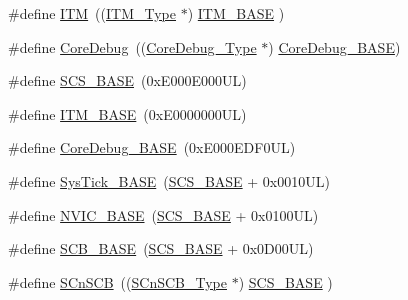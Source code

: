 \begin{DoxyCompactItemize}
\item 
\#define \hyperlink{group___c_m_s_i_s__core__register_gabae7cdf882def602cb787bb039ff6a43}{I\-T\-M}~((\hyperlink{struct_i_t_m___type}{I\-T\-M\-\_\-\-Type}       $\ast$)     \hyperlink{group___c_m_s_i_s__core__register_gadd76251e412a195ec0a8f47227a8359e}{I\-T\-M\-\_\-\-B\-A\-S\-E}      )
\item 
\#define \hyperlink{group___c_m_s_i_s__core__register_gab6e30a2b802d9021619dbb0be7f5d63d}{Core\-Debug}~((\hyperlink{struct_core_debug___type}{Core\-Debug\-\_\-\-Type} $\ast$)     \hyperlink{group___c_m_s_i_s__core__register_ga680604dbcda9e9b31a1639fcffe5230b}{Core\-Debug\-\_\-\-B\-A\-S\-E})
\end{DoxyCompactItemize}
\begin{DoxyCompactItemize}
\item 
\#define \hyperlink{group___c_m_s_i_s__core__register_ga3c14ed93192c8d9143322bbf77ebf770}{S\-C\-S\-\_\-\-B\-A\-S\-E}~(0x\-E000\-E000\-U\-L)
\item 
\#define \hyperlink{group___c_m_s_i_s__core__register_gadd76251e412a195ec0a8f47227a8359e}{I\-T\-M\-\_\-\-B\-A\-S\-E}~(0x\-E0000000\-U\-L)
\item 
\#define \hyperlink{group___c_m_s_i_s__core__register_ga680604dbcda9e9b31a1639fcffe5230b}{Core\-Debug\-\_\-\-B\-A\-S\-E}~(0x\-E000\-E\-D\-F0\-U\-L)
\item 
\#define \hyperlink{group___c_m_s_i_s__core__register_ga58effaac0b93006b756d33209e814646}{Sys\-Tick\-\_\-\-B\-A\-S\-E}~(\hyperlink{group___c_m_s_i_s__core__register_ga3c14ed93192c8d9143322bbf77ebf770}{S\-C\-S\-\_\-\-B\-A\-S\-E} +  0x0010\-U\-L)
\item 
\#define \hyperlink{group___c_m_s_i_s__core__register_gaa0288691785a5f868238e0468b39523d}{N\-V\-I\-C\-\_\-\-B\-A\-S\-E}~(\hyperlink{group___c_m_s_i_s__core__register_ga3c14ed93192c8d9143322bbf77ebf770}{S\-C\-S\-\_\-\-B\-A\-S\-E} +  0x0100\-U\-L)
\item 
\#define \hyperlink{group___c_m_s_i_s__core__register_gad55a7ddb8d4b2398b0c1cfec76c0d9fd}{S\-C\-B\-\_\-\-B\-A\-S\-E}~(\hyperlink{group___c_m_s_i_s__core__register_ga3c14ed93192c8d9143322bbf77ebf770}{S\-C\-S\-\_\-\-B\-A\-S\-E} +  0x0\-D00\-U\-L)
\item 
\#define \hyperlink{group___c_m_s_i_s__core__register_ga9fe0cd2eef83a8adad94490d9ecca63f}{S\-Cn\-S\-C\-B}~((\hyperlink{struct_s_cn_s_c_b___type}{S\-Cn\-S\-C\-B\-\_\-\-Type}    $\ast$)     \hyperlink{group___c_m_s_i_s__core__register_ga3c14ed93192c8d9143322bbf77ebf770}{S\-C\-S\-\_\-\-B\-A\-S\-E}      )
\item 

\end{DoxyCompactItemize}
